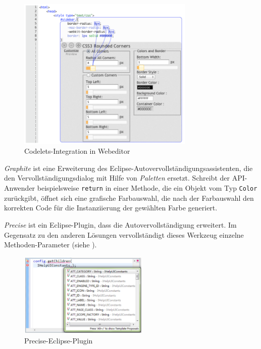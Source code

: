 \begin{figure}[!ht]
  \centering
    \includegraphics[width=0.75\textwidth]{Figures/tools/codelets.png}
  \caption{Codelets-Integration in Webeditor \citep{Oney:2012ge}}
  \label{fig:codelets}
\end{figure}


\textit{Graphite} \citep{Omar:2012tw} ist eine Erweiterung des Eclipse-Autovervollständigungsassistenten, die den Vervollständigungsdialog mit Hilfe von \textit{Paletten} ersetzt. Schreibt der API-Anwender beispielsweise \texttt{return} in einer Methode, die ein Objekt vom Typ \texttt{Color} zurückgibt, öffnet sich eine grafische Farbauswahl, die nach der Farbauswahl den korrekten Code für die Instanziierung der gewählten Farbe generiert.


\textit{Precise} \citep{Zhang:2012wl} ist ein Eclipse-Plugin, dass die Autovervollständigung erweitert. Im Gegensatz zu den anderen Lösungen vervollständigt dieses Werkzeug einzelne Methoden-Parameter (siehe ).

\begin{figure}[!ht]
  \centering
    \includegraphics[width=0.55\textwidth]{Figures/tools/precise.png}
  \caption{Precise-Eclipse-Plugin \citep{Zhang:2012wl}}
  \label{fig:precise}
\end{figure}


